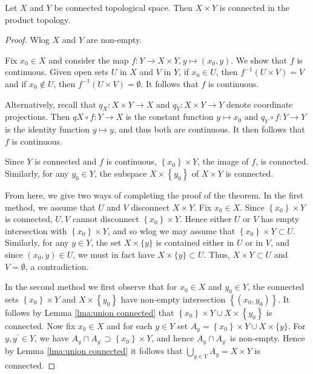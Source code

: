 \documentclass[a4paper,11pt]{article}
\begin{document}
\begin{theorem}\label{thm:product connected}
    Let $X$ and $Y$ be connected topological space. Then $X \times Y$ is connected in the product topology.
\end{theorem}
\begin{proof}
    Wlog $X$ and $Y$ are non-empty.

    Fix $x_{0} \in X$ and consider the map $f: Y \rightarrow X \times Y, y \mapsto\left(x_{0}, y\right)$. We show that $f$ is continuous. Given open sets $U$ in $X$ and $V$ in $Y$, if $x_{0} \in U$, then $f^{-1}(U \times V)=V$ and if $x_{0} \notin U$, then $f^{-1}(U \times V)=\emptyset$. It follows that $f$ is continuous.

    Alternatively, recall that $q_{X}: X \times Y \rightarrow X$ and $q_{Y}: X \times Y \rightarrow Y$ denote coordinate projections. Then $q X \circ f: Y \rightarrow X$ is the constant function $y \mapsto x_{0}$ and $q_{Y} \circ f: Y \rightarrow Y$ is the identity function $y \mapsto y$, and thus both are continuous. It then follows that $f$ is continuous.

    Since $Y$ is connected and $f$ is continuous, $\left\{x_{0}\right\} \times Y$, the image of $f$, is connected. Similarly, for any $y_{0} \in Y$, the subspace $X \times\left\{y_{0}\right\}$ of $X \times Y$ is connected.

    From here, we give two ways of completing the proof of the theorem. In the first method, we assume that $U$ and $V$ disconnect $X \times Y$. Fix $x_{0} \in X$. Since $\left\{x_{0}\right\} \times Y$ is connected, $U, V$ cannot disconnect $\left\{x_{0}\right\} \times Y$. Hence either $U$ or $V$ has empty intersection with $\left\{x_{0}\right\} \times Y$, and so wlog we may assume that $\left\{x_{0}\right\} \times Y \subset U$. Similarly, for any $y \in Y$, the set $X \times\{y\}$ is contained either in $U$ or in $V$, and since $\left(x_{0}, y\right) \in U$, we must in fact have $X \times\{y\} \subset U$. Thus, $X \times Y \subset U$ and $V=\emptyset$, a contradiction.

    In the second method we first observe that for $x_{0} \in X$ and $y_{0} \in Y$, the connected sets $\left\{x_{0}\right\} \times Y$ and $X \times\left\{y_{0}\right\}$ have non-empty intersection $\left\{\left(x_{0}, y_{0}\right)\right\}$. It follows by Lemma \ref{lma:union connected} that $\left\{x_{0}\right\} \times Y \cup X \times\left\{y_{0}\right\}$ is connected. Now fix $x_{0} \in X$ and for each $y \in Y$ set $A_{y}=\left\{x_{0}\right\} \times Y \cup X \times\{y\}$. For $y, y^{\prime} \in Y$, we have $A_{y} \cap A_{y^{\prime}} \supset\left\{x_{0}\right\} \times Y$, and hence $A_{y} \cap A_{y^{\prime}}$ is non-empty. Hence by Lemma \ref{lma:union connected} it follows that $\bigcup_{y \in Y} A_{y}=X \times Y$ is connected.
\end{proof}
\end{document}
